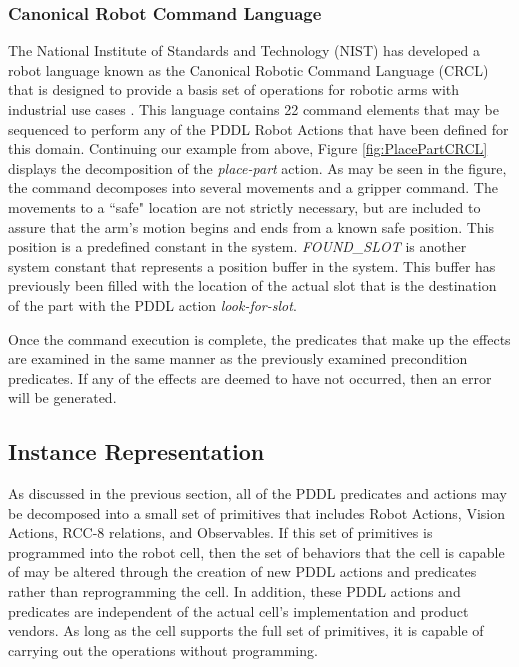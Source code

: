 \subsubsection{Canonical Robot Command Language}
The National Institute of Standards and Technology (NIST) has developed a
robot language known
as the Canonical Robotic Command Language (CRCL) that is designed to provide
a basis set of operations for robotic arms with industrial use 
cases \cite{Balakirsky2012-1}. This language contains 22 command elements that
may be sequenced to perform any of the PDDL Robot Actions that have been defined
for this domain. Continuing our example from above, 
Figure \ref{fig:PlacePartCRCL} displays the decomposition of the \textit{place-part} action.
As may be seen in the figure, the command decomposes into several movements and a gripper
command. The movements to a ``safe" location are not strictly necessary, but are
included to assure that the arm's motion begins and ends from a known safe position.
This position is a predefined constant in the system.
\textit{FOUND\_SLOT} is another system constant that represents a position buffer in 
the system. This buffer has previously been filled with the location of the actual
slot that is the destination of the part with the PDDL action 
\textit{look-for-slot}. 

Once the command execution is complete, the predicates that make up the effects
are examined in the same manner as the previously examined precondition predicates.
If any of the effects are deemed to have not occurred, then an error will be
generated.
\subsection{Instance Representation}
As discussed in the previous section, all of the PDDL predicates and actions may be
decomposed into a small set of primitives that includes
Robot Actions, Vision Actions, RCC-8 relations, and Observables. 
If this set of primitives is
programmed into the robot cell, then the set of behaviors that the cell is capable of
may be altered through the creation of new PDDL actions and predicates rather than
reprogramming the cell. In addition, these PDDL actions and predicates are independent
of the actual cell's implementation and product vendors. As long as the cell supports the
full set of primitives, it is capable of carrying out the operations without programming.


